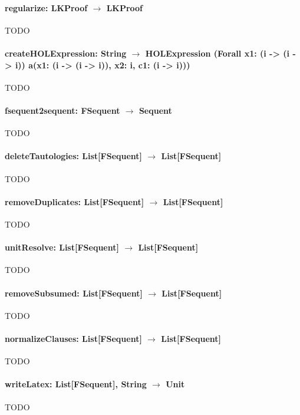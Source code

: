 \documentclass[a4paper,11pt]{article}
\begin{document}
\begin{appendix}
\paragraph{\textbf{regularize: LKProof $\rightarrow$ LKProof}}
{\color{red}TODO}

\paragraph{\textbf{createHOLExpression: String $\rightarrow$ HOLExpression
(Forall x1: (i -> (i -> i)) a(x1: (i -> (i -> i)), x2: i, c1: (i -> i)))}}
{\color{red}TODO}

\paragraph{\textbf{fsequent2sequent: FSequent $\rightarrow$ Sequent}}
{\color{red}TODO}

\paragraph{\textbf{deleteTautologies: List[FSequent] $\rightarrow$ List[FSequent]}}
{\color{red}TODO}

\paragraph{\textbf{removeDuplicates: List[FSequent] $\rightarrow$ List[FSequent]}}
{\color{red}TODO}

\paragraph{\textbf{unitResolve: List[FSequent] $\rightarrow$ List[FSequent]}}
{\color{red}TODO}

\paragraph{\textbf{removeSubsumed: List[FSequent] $\rightarrow$ List[FSequent]}}
{\color{red}TODO}

\paragraph{\textbf{normalizeClauses: List[FSequent] $\rightarrow$ List[FSequent]}}
{\color{red}TODO}

\paragraph{\textbf{writeLatex: List[FSequent], String $\rightarrow$ Unit}}
{\color{red}TODO}


\end{appendix}
\end{document}
